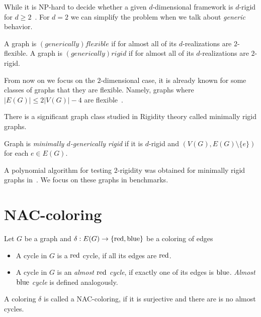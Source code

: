 While it is NP-hard to decide whether a given \( d \)-dimensional framework is
\( d \)-rigid for \( d \ge 2 \)~\cite{d_rigidity_hardness}.
For \( d = 2 \) we can simplify the problem when we talk about \emph{generic}
behavior.
%
\begin{definition}
	A graph is \( (generically) flexible \) if for almost all of
	its \( d \)-realizations are \( 2 \)-flexible.
	A graph is \( (generically) rigid \) if for almost all of
	its \( d \)-realizations are \( 2 \)-rigid.
\end{definition}
%

From now on we focus on the \( 2 \)-dimensional case,
it is already known for some classes of graphs that they are flexible.
Namely, graphs where \( |E(G)| \le 2|V(G)| - 4 \)
are flexible~\cite{stable_cuts_2v_4}.

There is a significant graph class studied in Rigidity theory called minimally rigid graphs.
%
\begin{definition}
	Graph is \emph{minimally \( d \)-generically rigid} if it is \( d \)-rigid
	and \( (V(G), E(G) \setminus \{e\}) \) for each \( e \in E(G) \).
\end{definition}
%

A polynomial algorithm for testing \( 2 \)-rigidity was obtained
for minimally rigid graphs in~\cite{polynomial-min-rigid}.
We focus on these graphs in benchmarks.



\section{NAC-coloring}

\begin{definition}
	Let \( G \) be a graph and \( \delta: E(G) \to \{ \text{red}, \text{blue} \} \)
	be a coloring of edges
	\begin{itemize}
		\item A cycle in \( G \) is a \( \text{red} \) cycle, if all its edges are \( \text{red} \).
		\item A cycle in \( G \) is an \emph{almost \( \text{red} \) cycle},
		      if exactly one of its edges is \( \text{blue} \).
		      \emph{Almost \( \text{blue} \) cycle} is defined analogously.
	\end{itemize}
	A coloring \( \delta \) is called a NAC-coloring, if it is surjective
	and there are is no almost cycles.
\end{definition}
%

